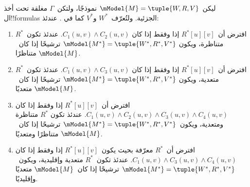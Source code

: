 \documentclass[../../../include/open-logic-section]{subfiles}
\begin{document}
\begin{thm}
  ليكن~$\mModel{M}=\tuple{W,R,V}$ نموذجًا، ولتكن~$\Gamma$ مغلقة تحت
  أخذ ال!!{formula}s الجزئية. ولتُعرّف~$W^*$ و$V^*$ كما في
  . عندئذ:
  \begin{enumerate}
  \item افترض أن~$R^*[u][v]$ إذا وفقط إذا كان
    $C_1(u,v)\land C_2(u,v)$. عندئذ تكون~$R^*$ متناظرة، ويكون
    $\mModel{M^*}=\tuple{W^*,R^*,V^*}$ ترشيحًا إذا كان~$\mModel{M}$
    متناظرًا.
  \item افترض أن~$R^*[u][v]$ إذا وفقط إذا كان
    $C_1(u,v)\land C_3(u,v)$. عندئذ تكون~$R^*$ متعدية، ويكون
    $\mModel{M^*}=\tuple{W^*,R^*,V^*}$ ترشيحًا إذا كان~$\mModel{M}$
    متعديًا.
  \item افترض أن~$R^*[u][v]$ إذا وفقط إذا كان
    $C_1(u,v)\land C_2(u,v)\land C_3(u,v)\land C_4(u,v)$. عندئذ تكون
    $R^*$ متناظرة ومتعدية، ويكون~$\mModel{M^*}=\tuple{W^*,R^*,V^*}$
    ترشيحًا إذا كان~$\mModel{M}$ متناظرًا ومتعديًا.
  \item افترض أن~$R^*$ معرّفة بحيث يكون~$R^*[u][v]$ إذا وفقط إذا كان
    $C_1(u,v)\land C_3(u,v)\land C_4(u,v)$. عندئذ تكون~$R^*$ متعدية
    وإقليدية، ويكون~$\mModel{M^*}=\tuple{W^*,R^*,V^*}$ ترشيحًا إذا
    كان~$\mModel{M}$ متعديًا وإقليديًا.
  \end{enumerate}
\end{thm}
\end{document}
